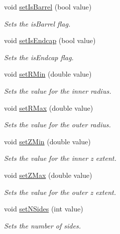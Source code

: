 \begin{DoxyCompactItemize}
void \hyperlink{class_d_d4hep_1_1_d_d_rec_1_1_subdetector_extension_impl_ad63db1c5bca1c435c0f79514f47798d0}{setIsBarrel} (bool value)
\begin{DoxyCompactList}\small\item\em Sets the isBarrel flag. \item\end{DoxyCompactList}\item 
void \hyperlink{class_d_d4hep_1_1_d_d_rec_1_1_subdetector_extension_impl_acd89d4d2553a6ba4006ad39631fa864b}{setIsEndcap} (bool value)
\begin{DoxyCompactList}\small\item\em Sets the isEndcap flag. \item\end{DoxyCompactList}\item 
void \hyperlink{class_d_d4hep_1_1_d_d_rec_1_1_subdetector_extension_impl_af2d58ea0ea65579e473364de314720ca}{setRMin} (double value)
\begin{DoxyCompactList}\small\item\em Sets the value for the inner radius. \item\end{DoxyCompactList}\item 
void \hyperlink{class_d_d4hep_1_1_d_d_rec_1_1_subdetector_extension_impl_a3b92ffbf335b41a30b001f8bb09c985d}{setRMax} (double value)
\begin{DoxyCompactList}\small\item\em Sets the value for the outer radius. \item\end{DoxyCompactList}\item 
void \hyperlink{class_d_d4hep_1_1_d_d_rec_1_1_subdetector_extension_impl_a36879a3796e4eeccdc1d2ec1050894a8}{setZMin} (double value)
\begin{DoxyCompactList}\small\item\em Sets the value for the inner z extent. \item\end{DoxyCompactList}\item 
void \hyperlink{class_d_d4hep_1_1_d_d_rec_1_1_subdetector_extension_impl_ad4ff27b7c8cf4e9f0cdcd595fb271226}{setZMax} (double value)
\begin{DoxyCompactList}\small\item\em Sets the value for the outer z extent. \item\end{DoxyCompactList}\item 
void \hyperlink{class_d_d4hep_1_1_d_d_rec_1_1_subdetector_extension_impl_a5cbc7835f1656dbb21ce4c9d3442a74b}{setNSides} (int value)
\begin{DoxyCompactList}\small\item\em Sets the number of sides. \item\end{DoxyCompactList}\end{DoxyCompactItemize}
